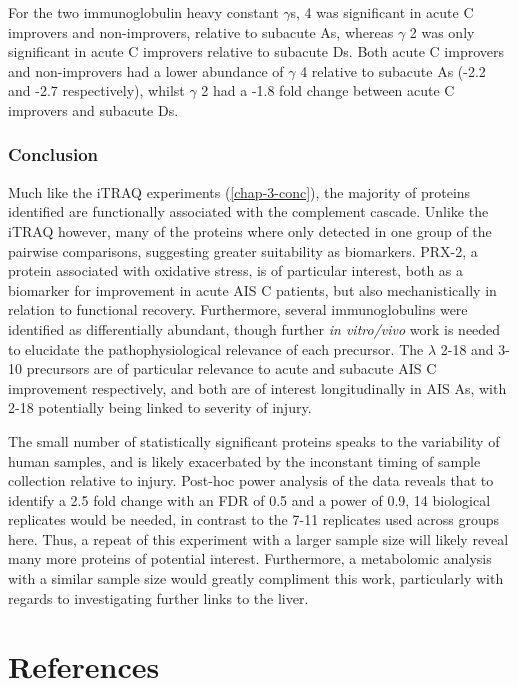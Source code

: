 \documentclass[
]{article}
\begin{document}
For the two immunoglobulin heavy constant \(\gamma\)s, 4 was significant in acute C improvers and non-improvers, relative to subacute As, whereas \(\gamma\) 2 was only significant in acute C improvers relative to subacute Ds.
Both acute C improvers and non-improvers had a lower abundance of \(\gamma\) 4 relative to subacute As (-2.2 and -2.7 respectively), whilst \(\gamma\) 2 had a -1.8 fold change between acute C improvers and subacute Ds.

\hypertarget{chap4-conc}{%
\subsubsection{Conclusion}\label{chap4-conc}}

Much like the iTRAQ experiments (\ref{chap-3-conc}), the majority of proteins identified are functionally associated with the complement cascade.
Unlike the iTRAQ however, many of the proteins where only detected in one group of the pairwise comparisons, suggesting greater suitability as biomarkers.
PRX-2, a protein associated with oxidative stress, is of particular interest, both as a biomarker for improvement in acute AIS C patients, but also mechanistically in relation to functional recovery.
Furthermore, several immunoglobulins were identified as differentially abundant, though further \emph{in vitro/vivo} work is needed to elucidate the pathophysiological relevance of each precursor.
The \(\lambda\) 2-18 and 3-10 precursors are of particular relevance to acute and subacute AIS C improvement respectively, and both are of interest longitudinally in AIS As, with 2-18 potentially being linked to severity of injury.

The small number of statistically significant proteins speaks to the variability of human samples, and is likely exacerbated by the inconstant timing of sample collection relative to injury.
Post-hoc power analysis of the data reveals that to identify a 2.5 fold change with an FDR of 0.5 and a power of 0.9, 14 biological replicates would be needed, in contrast to the 7-11 replicates used across groups here.
Thus, a repeat of this experiment with a larger sample size will likely reveal many more proteins of potential interest.
Furthermore, a metabolomic analysis with a similar sample size would greatly compliment this work, particularly with regards to investigating further links to the liver.

\hypertarget{references}{%
\section*{References}\label{references}}
\end{document}
